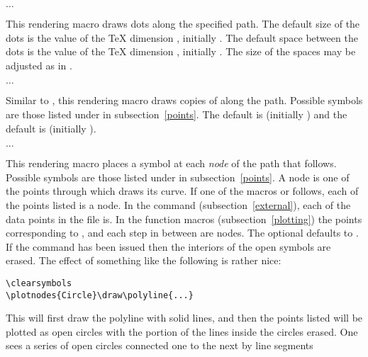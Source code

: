 \documentclass[letterpaper]{article}
\begin{document}
\begin{cd}
$\ldots$%
\end{cd}

This rendering macro draws dots along the specified path. The default
size of the dots is the value of the \TeX{} dimension ,
initially \dim{0.5pt}. The default space between the dots is the value
of the \TeX{} dimension , initially \dim{3pt}. The size of
the spaces may be adjusted as in .

\begin{cd}
$\ldots$%
\end{cd}

Similar to , this rendering macro draws copies of
 along the path. Possible symbols are those listed under
 in subsection~\ref{points}. The default  is
 (initially \dim{2pt}) and the default  is
 (initially \dim{5pt}).

\begin{cd}
$\ldots$%
\end{cd}

This rendering macro places a symbol at each \emph{node} of the path
that follows. Possible symbols are those listed under  in
subsection~\ref{points}. A node is one of the points through which \MF{}
draws its curve.  If one of the macros \marg{$\ldots$} or
\marg{$\ldots$} follows, each of the points listed is a node.
In the  command (subsection~\ref{external}), each of the
data points in the file is. In the function macros
(subsection~\ref{plotting}) the points corresponding to ,
 and each step in between are nodes. The optional 
defaults to . If the command  has been
issued then the interiors of the open symbols are erased. The effect of
something like the following is rather nice:
\begin{verbatim}
\clearsymbols
\plotnodes{Circle}\draw\polyline{...}
\end{verbatim}
This will first draw the polyline with solid lines, and then the points
listed will be plotted as open circles with the portion of the lines
inside the circles erased. One sees a series of open circles connected
one to the next by line segments
\end{document}

